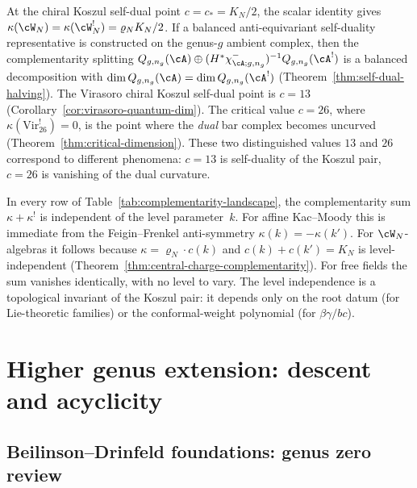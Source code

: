 \begin{remark}
\label{rem:self-dual-complementarity}
At the chiral Koszul self-dual point $c = c_* = K_N/2$, the scalar
identity gives
$\kappa(\cW_N) = \kappa(\cW_N^!) = \varrho_N K_N/2$.
If a balanced anti-equivariant self-duality representative is
constructed on the genus-$g$ ambient complex, then the
complementarity splitting
$Q_{g,n_g}(\cA)\oplus
(H^*\chi^-_{\cA;g,n_g})^{-1}Q_{g,n_g}(\cA^!)$ is a balanced decomposition
with $\dim Q_{g,n_g}(\cA) = \dim Q_{g,n_g}(\cA^!)$
(Theorem~\ref{thm:self-dual-halving}).
The Virasoro chiral Koszul self-dual point is $c=13$
(Corollary~\ref{cor:virasoro-quantum-dim}).
The critical value $c = 26$, where $\kappa(\mathrm{Vir}_{26}^!)
= 0$, is the point where the \emph{dual} bar complex becomes
uncurved (Theorem~\ref{thm:critical-dimension}). These two
distinguished values $13$ and $26$ correspond to different
phenomena: $c = 13$ is self-duality of the Koszul pair, $c = 26$
is vanishing of the dual curvature.
\end{remark}

\begin{remark}
\label{rem:level-independence-landscape}
In every row of Table~\ref{tab:complementarity-landscape}, the
complementarity sum $\kappa + \kappa^!$ is independent of
the level parameter~$k$. For affine Kac--Moody this is
immediate from the Feigin--Frenkel anti-symmetry
$\kappa(k) = -\kappa(k')$. For $\cW_N$-algebras it follows
because $\kappa = \varrho_N \cdot c(k)$ and
$c(k) + c(k') = K_N$ is level-independent
(Theorem~\ref{thm:central-charge-complementarity}). For free
fields the sum vanishes identically, with no level to vary.
The level independence is a topological invariant of the Koszul
pair: it depends only on the root datum (for
Lie-theoretic families) or the conformal-weight polynomial
(for $\beta\gamma/bc$).
\end{remark}

\section{Higher genus extension: descent and acyclicity}
\label{sec:higher-genus-descent}

\subsection{Beilinson--Drinfeld foundations: genus zero review}
\label{subsec:BD-genus-zero-review}

